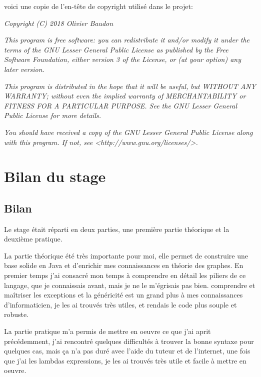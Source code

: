 \documentclass[12pt]{report}
\begin{document}
voici une copie de l'en-tête de copyright utilisé dans le projet:\newline

\begin{center}
\textit{Copyright (C) 2018 Olivier Baudon}

\textit{This program is free software: you can redistribute it and/or modify}
\textit{it under the terms of the GNU Lesser General Public License as published by}
\textit{the Free Software Foundation, either version 3 of the License, or}
\textit{(at your option) any later version.}

\textit{This program is distributed in the hope that it will be useful,}
\textit{but WITHOUT ANY WARRANTY; without even the implied warranty of}
\textit{MERCHANTABILITY or FITNESS FOR A PARTICULAR PURPOSE.  See the}
\textit{GNU Lesser General Public License for more details.}

\textit{You should have received a copy of the GNU Lesser General Public License}
\textit{along with this program.  If not, see <http://www.gnu.org/licenses/>.}
\end{center}

\chapter{Bilan du stage} 

\section{Bilan}

Le stage était réparti en deux parties, une première partie théorique et la deuxième pratique.\newline

La partie théorique été très importante pour moi, elle permet de construire une base solide en Java et d'enrichir mes connaissances en théorie des graphes. En premier temps j'ai consacré mon temps à comprendre en détail les piliers de ce langage, que je connaissais avant, mais je ne le m'égrisais pas bien. comprendre et maîtriser les exceptions et la généricité est un grand plus à mes connaissances d'informaticien, je les ai trouvés très utiles, et rendais le code plus souple et robuste.\newline

La partie pratique m'a permis de mettre en oeuvre ce que j'ai aprit précédemment, j'ai rencontré quelques difficultés à trouver la bonne syntaxe pour quelques cas, mais ça n'a pas duré avec l'aide du tuteur et de l'internet, une fois que j'ai les lambdas expressions, je les ai trouvés très utile et facile à mettre en oeuvre. \newline
\end{document}
